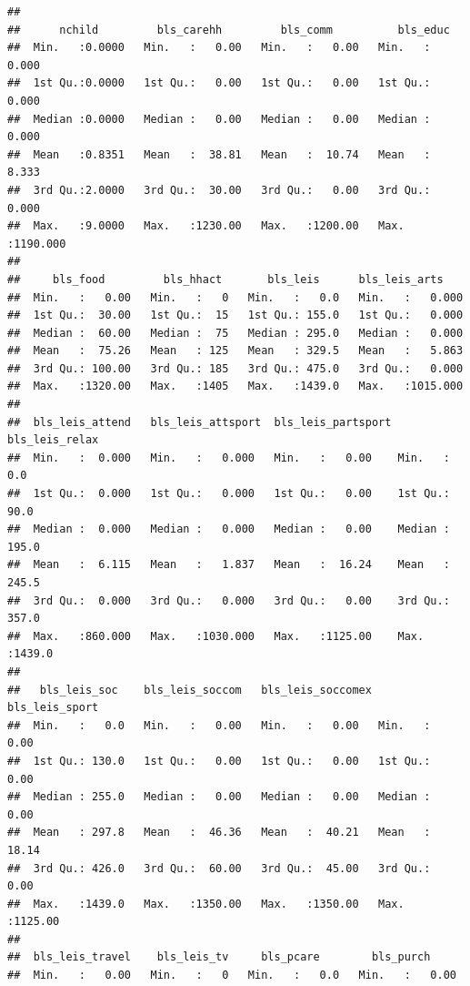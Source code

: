 \documentclass[
]{article}
\begin{document}
\begin{verbatim}
##                                                                   
##      nchild         bls_carehh         bls_comm          bls_educ       
##  Min.   :0.0000   Min.   :   0.00   Min.   :   0.00   Min.   :   0.000  
##  1st Qu.:0.0000   1st Qu.:   0.00   1st Qu.:   0.00   1st Qu.:   0.000  
##  Median :0.0000   Median :   0.00   Median :   0.00   Median :   0.000  
##  Mean   :0.8351   Mean   :  38.81   Mean   :  10.74   Mean   :   8.333  
##  3rd Qu.:2.0000   3rd Qu.:  30.00   3rd Qu.:   0.00   3rd Qu.:   0.000  
##  Max.   :9.0000   Max.   :1230.00   Max.   :1200.00   Max.   :1190.000  
##                                                                         
##     bls_food         bls_hhact       bls_leis      bls_leis_arts     
##  Min.   :   0.00   Min.   :   0   Min.   :   0.0   Min.   :   0.000  
##  1st Qu.:  30.00   1st Qu.:  15   1st Qu.: 155.0   1st Qu.:   0.000  
##  Median :  60.00   Median :  75   Median : 295.0   Median :   0.000  
##  Mean   :  75.26   Mean   : 125   Mean   : 329.5   Mean   :   5.863  
##  3rd Qu.: 100.00   3rd Qu.: 185   3rd Qu.: 475.0   3rd Qu.:   0.000  
##  Max.   :1320.00   Max.   :1405   Max.   :1439.0   Max.   :1015.000  
##                                                                      
##  bls_leis_attend   bls_leis_attsport  bls_leis_partsport bls_leis_relax  
##  Min.   :  0.000   Min.   :   0.000   Min.   :   0.00    Min.   :   0.0  
##  1st Qu.:  0.000   1st Qu.:   0.000   1st Qu.:   0.00    1st Qu.:  90.0  
##  Median :  0.000   Median :   0.000   Median :   0.00    Median : 195.0  
##  Mean   :  6.115   Mean   :   1.837   Mean   :  16.24    Mean   : 245.5  
##  3rd Qu.:  0.000   3rd Qu.:   0.000   3rd Qu.:   0.00    3rd Qu.: 357.0  
##  Max.   :860.000   Max.   :1030.000   Max.   :1125.00    Max.   :1439.0  
##                                                                          
##   bls_leis_soc    bls_leis_soccom   bls_leis_soccomex bls_leis_sport   
##  Min.   :   0.0   Min.   :   0.00   Min.   :   0.00   Min.   :   0.00  
##  1st Qu.: 130.0   1st Qu.:   0.00   1st Qu.:   0.00   1st Qu.:   0.00  
##  Median : 255.0   Median :   0.00   Median :   0.00   Median :   0.00  
##  Mean   : 297.8   Mean   :  46.36   Mean   :  40.21   Mean   :  18.14  
##  3rd Qu.: 426.0   3rd Qu.:  60.00   3rd Qu.:  45.00   3rd Qu.:   0.00  
##  Max.   :1439.0   Max.   :1350.00   Max.   :1350.00   Max.   :1125.00  
##                                                                        
##  bls_leis_travel    bls_leis_tv     bls_pcare        bls_purch      
##  Min.   :   0.00   Min.   :   0   Min.   :   0.0   Min.   :   0.00  

\end{verbatim}
\end{document}

